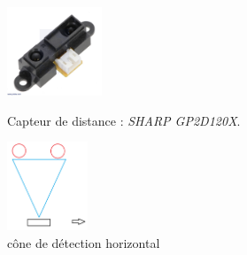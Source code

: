 \documentclass[a4paper,11pt]{article}
\begin{document}
\begin{figure}[H]
    \begin{minipage}[c]{.46\linewidth}
    \centering
    \includegraphics[height = 100]{Capteurs_d.jpg}
    \caption{Capteur de distance : \textit{SHARP GP2D120X}\cite{captdist}.}
    \label{fig:captdist}
    \end{minipage}
    \hfill
    \begin{minipage}[c]{.46\linewidth}
    \centering
    \includegraphics[height = 100]{capteurs_horizontaux.png}
    \caption{cône de détection horizontal}
    \label{fig:cônedetect}
    \end{minipage}
\end{figure}
\end{document}

